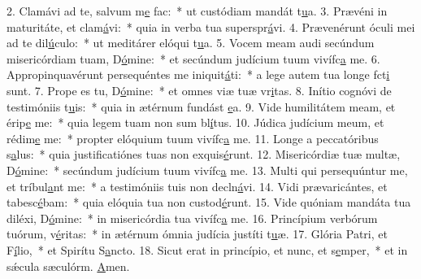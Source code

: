 2. Clamávi ad te, salvum m\uline{e} fac:~* ut custódiam mandát t\uline{u}a.
3. Prævéni in maturitáte, et clam\uline{á}vi:~* quia in verba tua superspr\uline{á}vi.
4. Prævenérunt óculi mei ad te dil\uline{ú}culo:~* ut meditárer elóqui t\uline{u}a.
5. Vocem meam audi secúndum misericórdiam tuam, D\uline{ó}mine:~* et secúndum judícium tuum vivífc\uline{a} me.
6. Appropinquavérunt persequéntes me iniquit\uline{á}ti:~* a lege autem tua longe fct\uline{i} sunt.
7. Prope es tu, D\uline{ó}mine:~* et omnes viæ tuæ vr\uline{i}tas.
8. Inítio cognóvi de testimóniis t\uline{u}is:~* quia in ætérnum fundást \uline{e}a.
9. Vide humilitátem meam, et érip\uline{e} me:~* quia legem tuam non sum bl\uline{í}tus.
10. Júdica judícium meum, et rédim\uline{e} me:~* propter elóquium tuum vivífc\uline{a} me.
11. Longe a peccatóribus s\uline{a}lus:~* quia justificatiónes tuas non exquis\uline{é}runt.
12. Misericórdiæ tuæ multæ, D\uline{ó}mine:~* secúndum judícium tuum vivífc\uline{a} me.
13. Multi qui persequúntur me, et tríbul\uline{a}nt me:~* a testimóniis tuis non decln\uline{á}vi.
14. Vidi prævaricántes, et tabesc\uline{é}bam:~* quia elóquia tua non custod\uline{é}runt.
15. Vide quóniam mandáta tua diléxi, D\uline{ó}mine:~* in misericórdia tua vivífc\uline{a} me.
16. Princípium verbórum tuórum, v\uline{é}ritas:~* in ætérnum ómnia judícia justíti t\uline{u}æ.
17. Glória Patri, et F\uline{í}lio,~* et Spirítu S\uline{a}ncto.
18. Sicut erat in princípio, et nunc, et s\uline{e}mper,~* et in sǽcula sæculórm. \uline{A}men.
